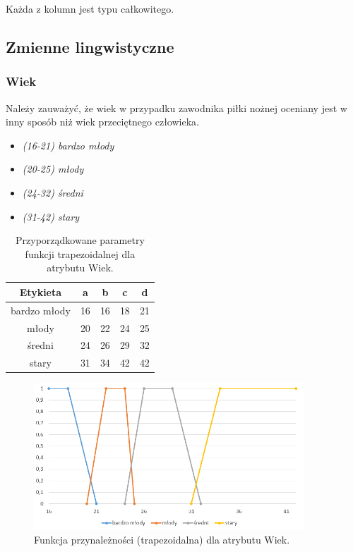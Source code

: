 \documentclass{classrep}
\begin{document}
	Każda z kolumn jest typu całkowitego.
	\newpage
	\subsection{Zmienne lingwistyczne}
	\subsubsection{Wiek}
	Należy zauważyć, że wiek w przypadku zawodnika piłki nożnej oceniany jest w inny sposób niż wiek przeciętnego człowieka.
	\begin{itemize}
		\item \textsl{(16-21) bardzo młody}
		\item \textsl{(20-25) młody}
		\item \textsl{(24-32) średni}
		\item \textsl{(31-42) stary}
	\end{itemize}
	
	\begin{table}[h!]
		\centering
		\begin{tabular} {c c c c c}
			\hline
			\textbf{Etykieta} & \textbf{a} & \textbf{b} & \textbf{c} & \textbf{d} \\ [0.5ex] 
			\hline	
			\hline 
			bardzo młody & 16 & 16 & 18 & 21  \\
			młody & 20 & 22 & 24 & 25  \\
			średni & 24 & 26 & 29 & 32  \\
			stary & 31 & 34 & 42 & 42  \\
			\hline
		\end{tabular}
		\caption{Przyporządkowane parametry funkcji trapezoidalnej dla atrybutu  Wiek. }
		\label{tabelaWiek}
	\end{table}

	\begin{figure}[h!]
		\centering
		\includegraphics[width=0.9\textwidth]{zmienne/1.png}
		\caption{Funkcja przynależności (trapezoidalna) dla atrybutu Wiek.}
		\label{wykresWiek}
	\end{figure}
	
\end{document}
